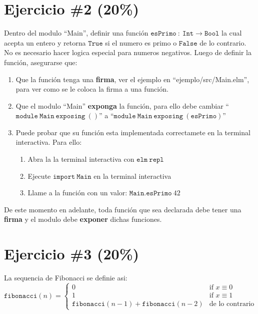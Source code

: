 \documentclass{article}
\begin{document}
\section*{Ejercicio \#2 (20\%)}
Dentro del modulo ``Main'', definir una funci\'on $\mathtt{esPrimo}\ :\ 
\mathtt{Int}\rightarrow\mathtt{Bool}$ la cual acepta un entero y retorna
$\mathtt{True}$ si el numero es primo o $\mathtt{False}$ de lo contrario.
No es necesario hacer logica especial para numeros negativos.
Luego de definir la funci\'on, asegurarse que:
\begin{enumerate}
        \item{Que la funci\'on tenga una {\bf firma}, ver el ejemplo
        en ``ejemplo/src/Main.elm'', para ver como se le coloca la
        firma a una funci\'on.}
        \item{Que el modulo ``Main'' {\bf exponga} la funci\'on, para ello
        debe cambiar ``$\mathtt{module\ Main\ exposing\ ()}$'' a
        ``$\mathtt{module\ Main\ exposing\ (esPrimo)}$''}
        \item{Puede probar que su funci\'on esta implementada correctamete
        en la terminal interactiva. Para ello:
        \begin{enumerate}
                \item{Abra la la terminal interactiva con $\mathtt{elm\ repl}$}
                \item{Ejecute $\mathtt{import\ Main}$ en la terminal interactiva}
                \item{Llame a la funci\'on con un valor: $\mathtt{Main.esPrimo}\ 42$}
        \end{enumerate}
        }
\end{enumerate}
De este momento en adelante, toda funci\'on que sea declarada debe tener
una {\bf firma} y el modulo debe {\bf exponer} dichas funciones.

\section*{Ejercicio \#3 (20\%)}
La sequencia de Fibonacci se definie asi:
\[
        \mathtt{fibonacci}(n) =
        \left\{
                \begin{array}{ll}
                        0  & \mbox{if } x \equiv 0 \\
                        1 & \mbox{if } x \equiv 1 \\
                        \mathtt{fibonacci}(n-1)+\mathtt{fibonacci}(n-2) & \mbox{de lo contrario}

                \end{array}
        \right.\]
\end{document}
